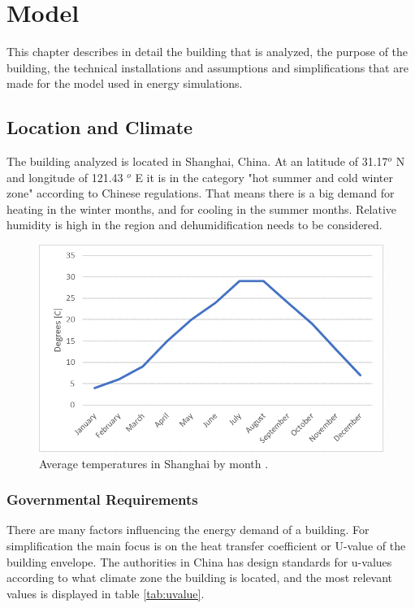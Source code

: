 \chapter{Model}
This chapter describes in detail the building that is analyzed, the purpose of the building, the technical installations and assumptions and simplifications that are made for the model used in energy simulations.

\section{Location and Climate}
The building analyzed is located in Shanghai, China. At an latitude of 31.17$^o$ N and longitude of 121.43 $^o$ E it is in the category "hot summer and cold winter zone" according to Chinese regulations. That means there is a big demand for heating in the winter months, and for cooling in the summer months. Relative humidity is high in the region and dehumidification needs to be considered. 

\begin{figure}[h!]
    \centering
    \includegraphics[scale=0.6]{vedlegg/tem.png}
    \caption{Average temperatures in Shanghai by month \cite{temp}.}
    \label{fig:temp}
\end{figure}

\subsection*{Governmental Requirements}
There are many factors influencing the energy demand of a building. For simplification the main focus is on the heat transfer coefficient or U-value of the building envelope. The authorities in China has design standards for u-values according to what climate zone the building is located, and the most relevant values is displayed in table \ref{tab:uvalue}. 


